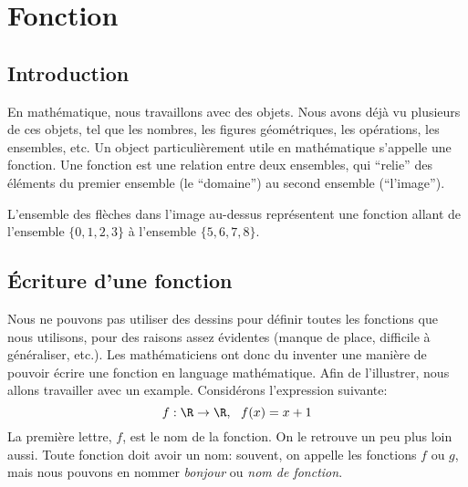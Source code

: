 \chapter{Fonction}

\section{Introduction}

En mathématique, nous travaillons avec des objets. Nous avons déjà vu plusieurs de ces objets, tel que les nombres, les figures géométriques, les opérations, les ensembles, etc. Un object particulièrement utile en mathématique s'appelle une fonction. Une fonction est une relation entre deux ensembles, qui ``relie'' des éléments du premier ensemble (le ``domaine'') au second ensemble (``l'image'').

\begin{center}
\end{center}

L'ensemble des flèches dans l'image au-dessus représentent une fonction allant de l'ensemble $\{0,1,2,3\}$ à l'ensemble $\{5,6,7,8\}$.

\section{Écriture d'une fonction}

Nous ne pouvons pas utiliser des dessins pour définir toutes les fonctions que nous utilisons, pour des raisons assez évidentes (manque de place, difficile à généraliser, etc.). Les mathématiciens ont donc du inventer une manière de pouvoir écrire une fonction en language mathématique. Afin de l'illustrer, nous allons travailler avec un example. Considérons l'expression suivante:
\[
    f: \R \to \R, \ \ f(x) = x + 1
\]
La première lettre, $f$, est le nom de la fonction. On le retrouve un peu plus loin aussi. Toute fonction doit avoir un nom: souvent, on appelle les fonctions $f$ ou $g$, mais nous pouvons en nommer \textit{bonjour} ou \textit{nom de fonction}.

